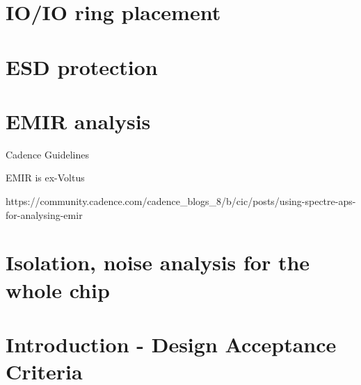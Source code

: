 \documentclass{article}
\begin{document}
\section{IO/IO ring placement}

\section{ESD protection}

\section{EMIR analysis}
Cadence Guidelines

EMIR is ex-Voltus

https://community.cadence.com/cadence_blogs_8/b/cic/posts/using-spectre-aps-for-analysing-emir


\section{Isolation, noise analysis for the whole chip}







\section*{Introduction - Design Acceptance Criteria} %
\end{document}
